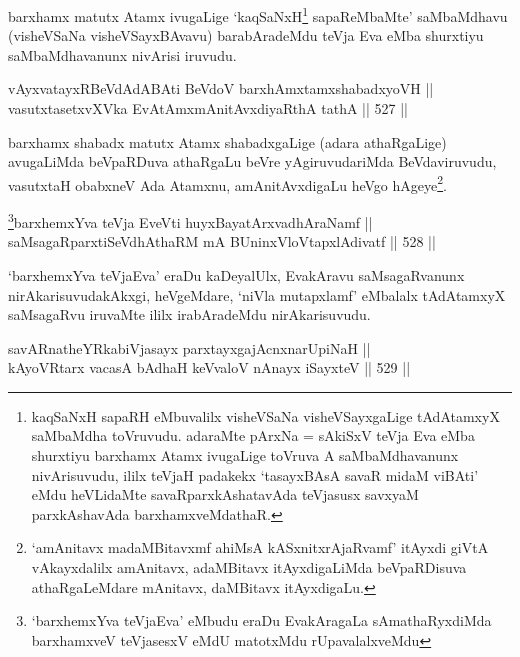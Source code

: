 \begin{artha}
barxhamx matutx Atamx ivugaLige `kaqSaNxH\footnote{kaqSaNxH sapaRH
eMbuvalilx visheVSaNa visheVSayxgaLige tAdAtamxyX saMbaMdha toVruvudu.
adaraMte pArxNa = sAkiSxV teVja Eva eMba shurxtiyu barxhamx Atamx
ivugaLige toVruva A saMbaMdhavanunx nivArisuvudu, ililx teVjaH padakekx
`tasayxBAsA savaR midaM viBAti' eMdu heVLidaMte savaRparxkAshatavAda
teVjasusx savxyaM parxkAshavAda barxhamxveMdathaR.} sapaReMbaMte'
saMbaMdhavu (visheVSaNa visheVSayxBAvavu) barabAradeMdu teVja Eva eMba
shurxtiyu saMbaMdhavanunx nivArisi iruvudu.
\end{artha}


\begin{shl}
vAyxvatayxRBeVdAdABAti BeVdoV barxhAmxtamxshabadxyoVH ||  \\
vasutxtasetxvXVka EvA\s \s tAmx\s mAnitAvxdiyaRthA tathA \hfill || 527 ||  
\end{shl}

\begin{artha}
barxhamx shabadx matutx Atamx shabadxgaLige (adara athaRgaLige)
avugaLiMda beVpaRDuva athaRgaLu beVre yAgiruvudariMda BeVdaviruvudu,
vasutxtaH obabxneV Ada Atamxnu, amAnitAvxdigaLu heVgo
hAgeye\footnote{`amAnitavx madaMBitavxmf ahiMsA kASxnitxrAjaRvamf'
itAyxdi giVtA vAkayxdalilx amAnitavx, adaMBitavx itAyxdigaLiMda
beVpaRDisuva athaRgaLeMdare mAnitavx, daMBitavx itAyxdigaLu.}.
\end{artha}


\begin{shl}
\footnote{`barxhemxYva teVjaEva' eMbudu eraDu EvakAragaLa sAmathaRyxdiMda barxhamxveV teVjasesxV eMdU matotxMdu rUpavalalxveMdu}barxhemxYva teVja EveVti huyxBayatArxvadhAraNamf ||  \\
saMsagaRparxtiSeVdhAthaRM mA BUninxVloVtapxlAdivatf \hfill || 528 ||  
\end{shl}

\begin{artha}
`barxhemxYva teVjaEva' eraDu kaDeyalUlx, EvakAravu
saMsagaRvanunx nirAkarisuvudakAkxgi, heVgeMdare, `niVla mutapxlamf'
eMbalalx tAdAtamxyX saMsagaRvu iruvaMte ililx irabAradeMdu
nirAkarisuvudu.
\end{artha}


\begin{shl}
savARnatheYRkabiVjasayx parxtayxgajAcnxnarUpiNaH || \\
kAyoVR\s tarx vacasA bAdhaH keVvaloV nAnayx iSayxteV \hfill || 529 ||  
\end{shl}

